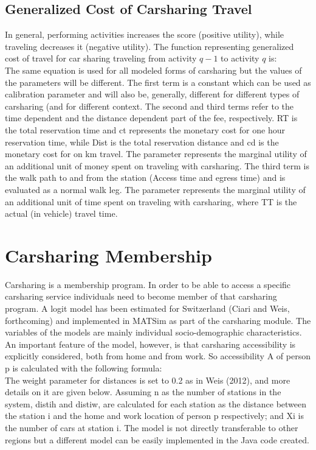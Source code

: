 \subsection{Generalized Cost of Carsharing Travel}
In general, performing activities increases the score (positive utility), while traveling decreases it (negative utility). The function representing generalized cost of travel for car sharing traveling from activity $q-1$ to activity $q$ is:
%
\begin{equation}
\end{equation}
%
The same equation is used for all modeled forms of carsharing but the values of the parameters will be different. The first term is a constant which can be used as calibration parameter and will also be, generally, different for different types of carsharing (and for different context. The second and third terms refer to the time dependent and the distance dependent part of the fee, respectively. RT is the total reservation time and ct represents the monetary cost for one hour reservation time, while Dist is the total reservation distance and cd is the monetary cost for on km travel. The parameter  represents the marginal utility of an additional unit of money spent on traveling with carsharing. The third term is the walk path to and from the station (Access time and egress time) and is evaluated as a normal walk leg. The parameter represents the marginal utility of an additional unit of time spent on traveling with carsharing, where TT is the actual (in vehicle) travel time. 

\section{Carsharing Membership}
Carsharing is a membership program. In order to be able to access a specific carsharing service individuals need to become member of that carsharing program. A logit model has been estimated for Switzerland (Ciari and Weis, forthcoming) and implemented in MATSim as part of the carsharing module. The variables of the models are mainly individual socio-demographic characteristics.  
An important feature of the model, however, is that carsharing accessibility is explicitly considered, both from home and from work. So accessibility A of person p is calculated with the following formula:
%
\begin{equation}
\end{equation}
%
The weight parameter for distances is set to 0.2 as in Weis (2012), and more details on it are given below. Assuming n as the number of stations in the system, distih and distiw, are calculated for each station as the distance between the station i and the home and work location of person p respectively; and Xi is the number of cars at station i. 
The model is not directly transferable to other regions but a different model can be easily implemented in the Java code created. 

